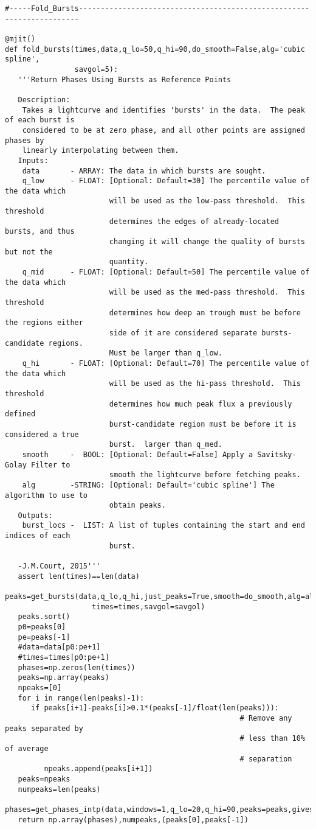 \begin{verbatim}
#-----Fold_Bursts----------------------------------------------------------------------

@mjit()
def fold_bursts(times,data,q_lo=50,q_hi=90,do_smooth=False,alg='cubic spline',
                savgol=5):
   '''Return Phases Using Bursts as Reference Points

   Description:
    Takes a lightcurve and identifies 'bursts' in the data.  The peak of each burst is
    considered to be at zero phase, and all other points are assigned phases by
    linearly interpolating between them.
   Inputs:
    data       - ARRAY: The data in which bursts are sought.
    q_low      - FLOAT: [Optional: Default=30] The percentile value of the data which
                        will be used as the low-pass threshold.  This threshold
                        determines the edges of already-located bursts, and thus
                        changing it will change the quality of bursts but not the
                        quantity.
    q_mid      - FLOAT: [Optional: Default=50] The percentile value of the data which
                        will be used as the med-pass threshold.  This threshold
                        determines how deep an trough must be before the regions either
                        side of it are considered separate bursts-candidate regions.
                        Must be larger than q_low.
    q_hi       - FLOAT: [Optional: Default=70] The percentile value of the data which
                        will be used as the hi-pass threshold.  This threshold
                        determines how much peak flux a previously defined
                        burst-candidate region must be before it is considered a true
                        burst.  larger than q_med.
    smooth     -  BOOL: [Optional: Default=False] Apply a Savitsky-Golay Filter to
                        smooth the lightcurve before fetching peaks.
    alg        -STRING: [Optional: Default='cubic spline'] The algorithm to use to
                        obtain peaks.
   Outputs:
    burst_locs -  LIST: A list of tuples containing the start and end indices of each
                        burst.

   -J.M.Court, 2015'''
   assert len(times)==len(data)
   peaks=get_bursts(data,q_lo,q_hi,just_peaks=True,smooth=do_smooth,alg=alg,
                    times=times,savgol=savgol)
   peaks.sort()
   p0=peaks[0]
   pe=peaks[-1]
   #data=data[p0:pe+1]
   #times=times[p0:pe+1]
   phases=np.zeros(len(times))
   peaks=np.array(peaks)
   npeaks=[0]   
   for i in range(len(peaks)-1):
      if peaks[i+1]-peaks[i]>0.1*(peaks[-1]/float(len(peaks))):
                                                      # Remove any peaks separated by 
                                                      # less than 10% of average
                                                      # separation
         npeaks.append(peaks[i+1])
   peaks=npeaks
   numpeaks=len(peaks)
   phases=get_phases_intp(data,windows=1,q_lo=20,q_hi=90,peaks=peaks,givespline=False)
   return np.array(phases),numpeaks,(peaks[0],peaks[-1])  


\end{verbatim}
